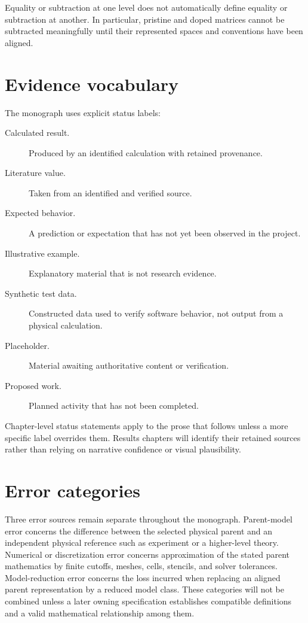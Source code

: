 Equality or subtraction at one level does not automatically define equality or
subtraction at another. In particular, pristine and doped matrices cannot be
subtracted meaningfully until their represented spaces and conventions have
been aligned.

\section{Evidence vocabulary}

The monograph uses explicit status labels:

\begin{description}
  \item[Calculated result.] Produced by an identified calculation with retained
    provenance.
  \item[Literature value.] Taken from an identified and verified source.
  \item[Expected behavior.] A prediction or expectation that has not yet been
    observed in the project.
  \item[Illustrative example.] Explanatory material that is not research
    evidence.
  \item[Synthetic test data.] Constructed data used to verify software behavior,
    not output from a physical calculation.
  \item[Placeholder.] Material awaiting authoritative content or verification.
  \item[Proposed work.] Planned activity that has not been completed.
\end{description}

Chapter-level status statements apply to the prose that follows unless a more
specific label overrides them. Results chapters will identify their retained
sources rather than relying on narrative confidence or visual plausibility.

\section{Error categories}

Three error sources remain separate throughout the monograph. Parent-model
error concerns the difference between the selected physical parent and an
independent physical reference such as experiment or a higher-level theory.
Numerical or discretization error concerns approximation of the stated parent
mathematics by finite cutoffs, meshes, cells, stencils, and solver tolerances.
Model-reduction error concerns the loss incurred when replacing an aligned
parent representation by a reduced model class. These categories will not be
combined unless a later owning specification establishes compatible definitions
and a valid mathematical relationship among them.

